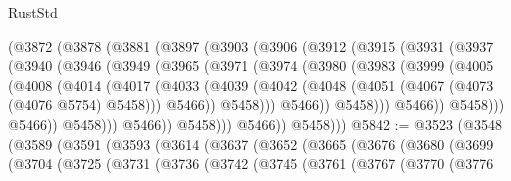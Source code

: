 \begin{lexlean}{RustStd}
\begin{coremodule}
          (@3872
            (@3878
              (@3881
                (@3897
                  (@3903
                    (@3906
                      (@3912
                        (@3915
                          (@3931
                            (@3937
                              (@3940
                                (@3946
                                  (@3949
                                    (@3965
                                      (@3971
                                        (@3974
                                          (@3980
                                            (@3983
                                              (@3999
                                                (@4005
                                                  (@4008
                                                    (@4014
                                                      (@4017
                                                        (@4033
                                                          (@4039
                                                            (@4042
                                                              (@4048
                                                                (@4051
                                                                  (@4067
                                                                    (@4073 (@4076 @5754) @5458)))
                                                                @5466))
                                                            @5458)))
                                                      @5466))
                                                  @5458)))
                                            @5466))
                                        @5458)))
                                  @5466))
                              @5458)))
                        @5466))
                    @5458)))
              @5466))
          @5458)))
@5842 := @3523
    (@3548
      (@3589
        (@3591
          (@3593
            (@3614
              (@3637
                (@3652
                  (@3665
                    (@3676
                      (@3680
                        (@3699
                          (@3704
                            (@3725
                              (@3731
                                (@3736
                                  (@3742
                                    (@3745
                                      (@3761
                                        (@3767
                                          (@3770
                                            (@3776

\end{coremodule}
\end{lexlean}
